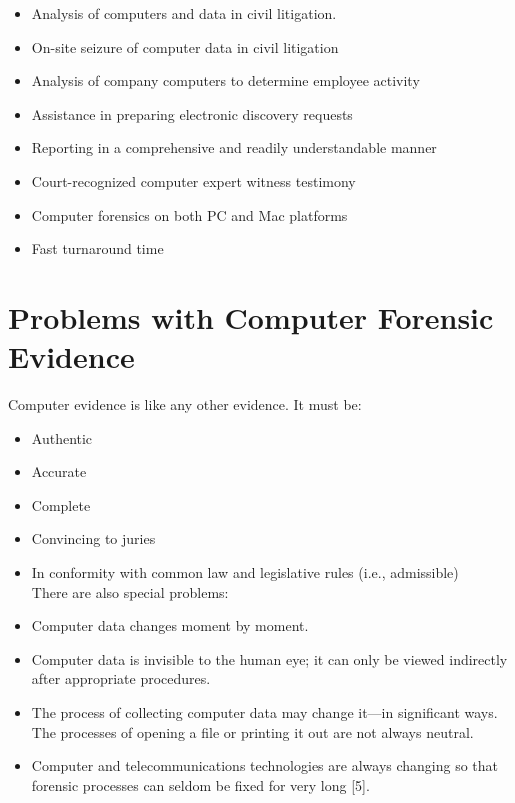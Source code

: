 \documentclass{scrreprt}
\begin{document}
\begin{itemize}
\begin{itemize}
\item Analysis of computers and data in civil litigation.
\item On-site seizure of computer data in civil litigation
\item Analysis of company computers to determine employee activity
\item Assistance in preparing electronic discovery requests
\item Reporting in a comprehensive and readily understandable manner
\item Court-recognized computer expert witness testimony
\item Computer forensics on both PC and Mac platforms
\item Fast turnaround time
\end{itemize}
\end{itemize}

\section{Problems with Computer Forensic Evidence}
Computer evidence is like any other evidence. It must be:
\begin{itemize}
\item Authentic
\item Accurate
\item Complete
\item Convincing to juries
\item In conformity with common law and legislative rules (i.e., admissible)
\\\linebreak There are also special problems:
\item Computer data changes moment by moment.
\item Computer data is invisible to the human eye; it can only be viewed indirectly
after appropriate procedures.
\item The process of collecting computer data may change it—in significant ways.
The processes of opening a file or printing it out are not always neutral.
\item Computer and telecommunications technologies are always changing so that
forensic processes can seldom be fixed for very long [5].
\end{itemize}
\end{document}
